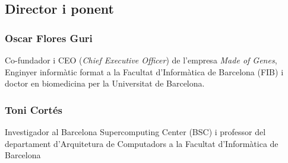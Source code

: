 \subsection{Director i ponent}
\label{context:director_ponent}
\subsubsection{Oscar Flores Guri}
Co-fundador i CEO (\textit{Chief Executive Officer}) de l'empresa \textit{Made of Genes}, Enginyer informàtic format a la Facultat d'Informàtica de Barcelona (FIB) i doctor en biomedicina per la Universitat de Barcelona.
\subsubsection{Toni Cortés}
Investigador al Barcelona Supercomputing Center (BSC) i professor del departament d'Arquitetura de Computadors a la Facultat d'Informàtica de Barcelona